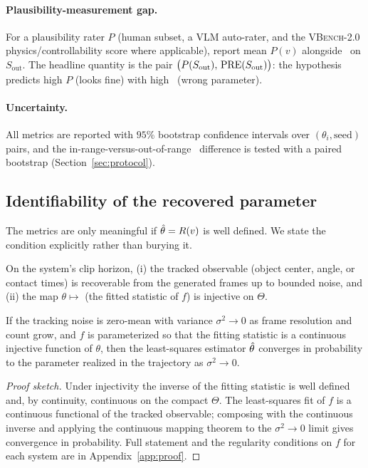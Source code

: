 \paragraph{Plausibility-measurement gap.}
For a plausibility rater $P$ (human subset, a VLM auto-rater, and the
\textsc{VBench-2.0} physics/controllability score \citep{vbench2_2025} where
applicable), report mean $P(v)$ alongside \PRE\ on $S_\text{out}$. The headline
quantity is the pair $\big(P(S_\text{out}),\,\mathrm{PRE}(S_\text{out})\big)$: the
hypothesis predicts high $P$ (looks fine) with high \PRE\ (wrong parameter).

\paragraph{Uncertainty.}
All metrics are reported with $95\%$ bootstrap confidence intervals over
$(\theta_i,\text{seed})$ pairs, and the in-range-versus-out-of-range \PRE\
difference is tested with a paired bootstrap (Section~\ref{sec:protocol}).

\subsection{Identifiability of the recovered parameter}

The metrics are only meaningful if $\hat{\theta}=R(v)$ is well defined. We state the
condition explicitly rather than burying it.

\begin{assumption}
\label{ass:ident}
On the system's clip horizon, (i) the tracked observable (object center,
angle, or contact times) is recoverable from the generated frames up to bounded
noise, and (ii) the map $\theta \mapsto$ (the fitted statistic of $f$) is
injective on $\Theta$.
\end{assumption}

\begin{proposition}[Consistency of $R$ under Assumption~\ref{ass:ident}]
\label{prop:consistency}
If the tracking noise is zero-mean with variance $\sigma^2\to 0$ as frame
resolution and count grow, and $f$ is parameterized so that the fitting
statistic is a continuous injective function of $\theta$, then the
least-squares estimator $\hat{\theta}$ converges in probability to the parameter
realized in the trajectory as $\sigma^2\to 0$.
\end{proposition}

\begin{proof}[Proof sketch]
Under injectivity the inverse of the fitting statistic is well defined and, by
continuity, continuous on the compact $\Theta$. The least-squares fit of $f$ is
a continuous functional of the tracked observable; composing with the
continuous inverse and applying the continuous mapping theorem to the
$\sigma^2\to 0$ limit gives convergence in probability. Full statement and the
regularity conditions on $f$ for each system are in Appendix~\ref{app:proof}.
\end{proof}

